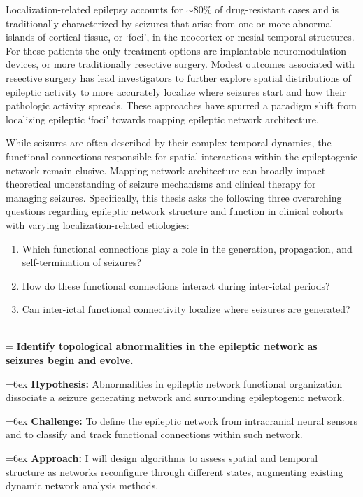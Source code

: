 Localization-related epilepsy accounts for $\sim$80\% of drug-resistant cases and is traditionally characterized by seizures that arise from one or more abnormal islands of cortical tissue, or `foci', in the neocortex or mesial temporal structures. For these patients the only treatment options are implantable neuromodulation devices, or more traditionally resective surgery. Modest outcomes associated with resective surgery has lead investigators to further explore spatial distributions of epileptic activity to more accurately localize where seizures start and how their pathologic activity spreads. These approaches have spurred a paradigm shift from localizing epileptic ‘foci’ towards mapping epileptic network architecture.

While seizures are often described by their complex temporal dynamics, the functional connections responsible for spatial interactions within the epileptogenic network remain elusive. Mapping network architecture can broadly impact theoretical understanding of seizure mechanisms and clinical therapy for managing seizures.
Specifically, this thesis asks the following three overarching questions regarding epileptic network structure and function in clinical cohorts with varying localization-related etiologies:
\begin{enumerate}[topsep=1ex, itemsep=0pt]
    \item Which functional connections play a role in the generation, propagation, and self-termination of seizures?
    \item How do these functional connections interact during inter-ictal periods?
    \item Can inter-ictal functional connectivity localize where seizures are generated?
\end{enumerate}

~\\
\hangindent=\parindent
{}
\noindent
{} \textbf{Identify topological abnormalities in the epileptic network as seizures begin and evolve.}

\hangindent=6ex
\textbf{Hypothesis:} Abnormalities in epileptic network functional organization dissociate a seizure generating network and surrounding epileptogenic network.

\hangindent=6ex
\textbf{Challenge:} To define the epileptic network from intracranial neural sensors and to classify and track functional connections within such network.

\hangindent=6ex
\textbf{Approach:} I will design algorithms to assess spatial and temporal structure as networks reconfigure through different states, augmenting existing dynamic network analysis methods.

